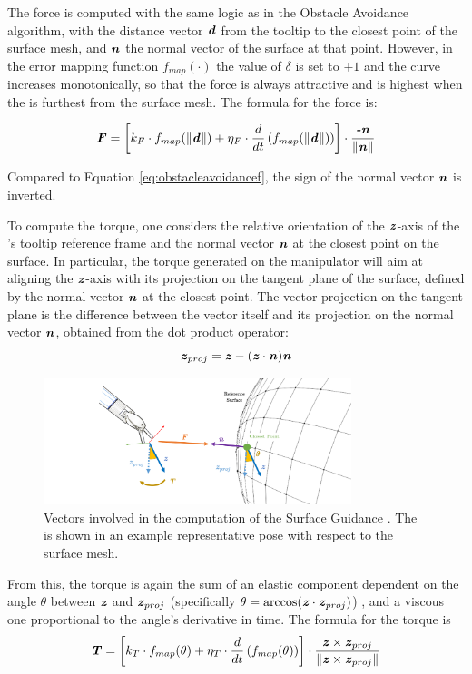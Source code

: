 \documentclass[../main.tex]{subfiles}
\begin{document}
The force is computed with the same logic as in the Obstacle Avoidance algorithm, with the distance vector $\textbf{\textit{d}}$ from the \psm tooltip to the closest point of the surface mesh, and $\textbf{\textit{n}}$ the normal vector of the surface at that point. However, in the error mapping function $f_{map}(\cdot)$ the value of $\delta$ is set to $+1$ and the curve increases monotonically, so that the force is always attractive and is highest when the \psm is furthest from the surface mesh. The formula for the force is:

\begin{equation}
    \textbf{\textit{F}} = \left[k_F\cdot f_{map}(\|\textbf{\textit{d}}\|) + \eta_F\cdot \frac{d}{dt} \left( f_{map}(\|\textbf{\textit{d}}\|)\right)\right]\cdot \frac{\textbf{\textit{-n}}}{\|\textbf{\textit{n}}\|} 
\end{equation}

Compared to Equation \ref{eq:obstacleavoidancef}, the sign of the normal vector $\textbf{\textit{n}}$ is inverted.

To compute the torque, one considers the relative orientation of the $\textbf{\textit{z}}$-axis of the \psm's tooltip reference frame and the normal vector $\textbf{\textit{n}}$ at the closest point on the surface. In particular, the torque generated on the manipulator will aim at aligning the $\textbf{\textit{z}}$-axis with its projection on the tangent plane of the surface, defined by the normal vector $\textbf{\textit{n}}$ at the closest point. The vector projection on the tangent plane is the difference between the vector itself and its projection on the normal vector $\textbf{\textit{n}}$, obtained from the dot product operator:
\begin{equation}
    \textbf{\textit{z}}_{proj} = \textbf{\textit{z}} - (\textbf{\textit{z}}\cdot\textbf{\textit{n}})\textbf{\textit{n}}
\end{equation} 
\begin{figure}
    \centering
    \includegraphics[width=0.8\textwidth]{images/surface_guidance.png}
    \caption{Vectors involved in the computation of the Surface Guidance \vf. The \psm is shown in an example representative pose with respect to the surface mesh.}
    \label{fig:surfaceguidance}
\end{figure}
From this, the torque is again the sum of an elastic component dependent on the angle $\theta$ between $\textbf{\textit{z}}$ and $\textbf{\textit{z}}_{proj}$ (specifically $\theta = \arccos(\textbf{\textit{z}}\cdot\textbf{\textit{z}}_{proj})$) , and a viscous one proportional to the angle's derivative in time. The formula for the torque is
\begin{equation}
    \textbf{\textit{T}} = \left[k_T\cdot f_{map}(\theta) + \eta_T\cdot \frac{d}{dt} \left( f_{map}(\theta)\right)\right]\cdot \frac{\textbf{\textit{z}} \times \textbf{\textit{z}}_{proj}}{\|\textbf{\textit{z}} \times \textbf{\textit{z}}_{proj}\|}
    \label{eq:}
\end{equation}
\end{document}

